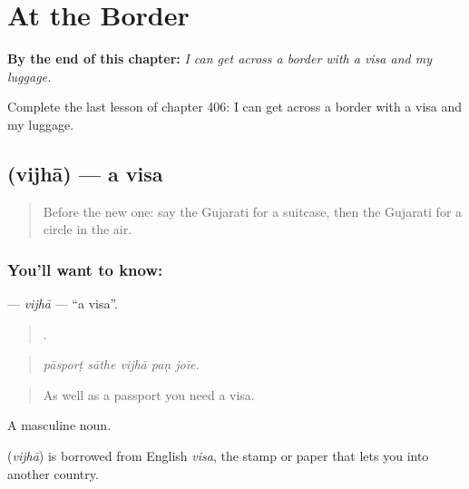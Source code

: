 
\chapter{At the Border}
\label{ch:gu-at-the-border}

\begin{chapteropening}
\textbf{By the end of this chapter:} \emph{I can get across a border with a visa and my luggage.}

Complete the last lesson of chapter 406: I can get across a border with a visa and my luggage.
\end{chapteropening}

\section[\texorpdfstring{\gu{વિઝા} (vijhā)}{વિઝા (vijhā)}]{ (vijhā) — a visa}

\label{lesson:GU-C406-vijha}



\begin{quote}
Before the new one: say the Gujarati for a suitcase, then the Gujarati for a circle in the air.
\end{quote}

\subsection*{You'll want to know: }
\textbf{} — \emph{vijhā} — \textquotedblleft{}a visa\textquotedblright{}.

\begin{quote}
    .
\end{quote}

\begin{quote}
\emph{pāsporṭ sāthe vijhā paṇ joīe.}
\end{quote}

\begin{quote}
As well as a passport you need a visa.
\end{quote}

A masculine noun.

\begin{cousinweb}
\textbf{} (\emph{vijhā}) is borrowed from English \emph{visa}, the stamp or paper that lets you into another country.
\end{cousinweb}

